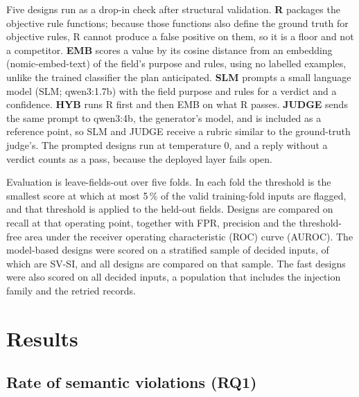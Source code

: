 \documentclass[conference]{IEEEtran}
\begin{document}
Five designs run as a drop-in check after structural validation. \textbf{R} packages the objective
rule functions; because those functions also define the ground truth for objective rules, R cannot
produce a false positive on them, so it is a floor and not a competitor. \textbf{EMB} scores a
value by its cosine distance from an embedding (nomic-embed-text) of the field's purpose and rules,
using no labelled examples, unlike the trained classifier the plan anticipated. \textbf{SLM} prompts a
small language model (SLM; qwen3:1.7b) with the field purpose and rules for a verdict and a confidence.
\textbf{HYB} runs R first and then EMB on what R passes. \textbf{JUDGE} sends the same prompt to
qwen3:4b, the generator's model, and is included as a reference point, so SLM and JUDGE receive a rubric
similar to the ground-truth judge's. The prompted designs run at temperature 0, and a reply without a
verdict counts as a pass, because the deployed layer fails open.

Evaluation is leave-fields-out over five folds. In each fold the threshold is the smallest score at
which at most 5\,\% of the valid training-fold inputs are flagged, and that threshold is applied to the
held-out fields. Designs are compared on recall at that operating point, together with FPR, precision
and the threshold-free area under the receiver operating characteristic (ROC) curve (AUROC). The
model-based designs were scored on a stratified sample of  decided inputs, of which
 are SV-SI, and all designs are compared on that sample. The fast designs were also scored on
all  decided inputs, a population that includes the injection family and the retried
records.

\section{Results}
\label{sec:results}

\subsection{Rate of semantic violations (RQ1)}
\end{document}
